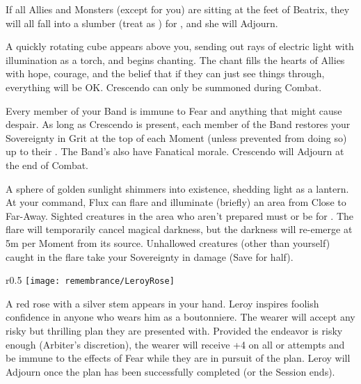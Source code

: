 If all Allies and Monsters (except for you) are sitting at the feet of Beatrix, they will all fall into a slumber (treat as ) for , and she will Adjourn.



A quickly rotating cube appears above you, sending out rays of electric light with illumination as a torch, and begins chanting.  The chant fills the hearts of Allies with hope, courage, and the belief that if they can just see things through, everything will be OK. Crescendo can only be summoned during Combat. 

Every member of your Band is immune to Fear and anything that might cause despair. As long as Crescendo is present, each member of the Band restores your Sovereignty in Grit at the top of each Moment (unless prevented from doing so) up to their \MAX. The Band's  also have Fanatical morale. Crescendo will Adjourn at the end of Combat.


A sphere of golden sunlight shimmers into existence, shedding light as a lantern. At your command, Flux can flare and illuminate (briefly) an area from Close to Far-Away.  Sighted creatures in the area who aren't prepared must  or be  for .  The flare will temporarily cancel magical darkness, but the darkness  will re-emerge at 5m per Moment from its source.  Unhallowed creatures (other than yourself) caught in the flare take your Sovereignty in damage (Save for half). 


\begin{wrapfigure}[20]{r}{0.5\textwidth}
    \texttt{[image: remembrance/LeroyRose]}
\end{wrapfigure}

A red rose with a silver stem appears in your hand.  Leroy inspires foolish confidence in anyone who wears him as a boutonniere.  The wearer will accept any risky but thrilling plan they are presented with. Provided the endeavor is risky enough (Arbiter's discretion), the wearer will receive +4 on all \RO or \RB attempts and be immune to the effects of Fear while they are in pursuit of the plan. Leroy will Adjourn once the plan has been successfully completed (or the Session ends).

